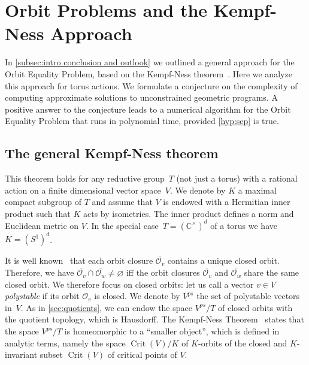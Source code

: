 \documentclass[10pt,a4paper]{article}
\theoremstyle{definition}
\DeclareMathOperator{\Crit}{Crit}
\newcommand{\CC}{\mathbb{C}}
\newcommand{\OO}{\ensuremath{\mathcal{O}}}
\numberwithin{equation}{section}
\begin{document}
\section{Orbit Problems and the Kempf-Ness Approach}\label{sec:kempf-ness}
In \cref{subsec:intro conclusion and outlook} we outlined a general approach for
the Orbit Equality Problem,
based on the Kempf-Ness theorem~\cite{kempfness}.
Here we analyze this approach for torus actions.
We formulate a conjecture on the complexity of computing approximate solutions to unconstrained geometric programs.
A positive answer to the conjecture leads to a numerical algorithm for the Orbit Equality Problem  %
that runs in polynomial time, provided \cref{hyp:sep} is true.


\subsection{The general Kempf-Ness theorem}
This theorem holds for any reductive group~$T$
(not just a torus) with a rational action on a finite dimensional vector space~$V$.
We denote by $K$ a maximal compact subgroup of $T$ and assume that $V$
is endowed with a Hermitian inner product such that $K$ acts by isometries.
The inner product defines a norm and Euclidean metric on $V$.
In the special case~$T=(\CC^\times)^d$ of a torus we have $K=(S^1)^d$.

It is well known~\cite[Thm.~2.3.6]{derksen-kemper}
that each orbit closure $\overline{\OO_v}$ contains a unique closed orbit.
Therefore, we have
$\overline{\OO_v}\cap\overline{\OO_w}\neq\varnothing$
iff the orbit closures $\overline{\OO_v}$ and $\overline{\OO_w}$ share the same closed orbit.
We therefore focus on closed orbits:
let us call a vector $v\in V$ \textit{polystable} if its orbit $\OO_v$ is closed.
We denote by $V^{ps}$ the set of polystable vectors in~$V$.
As in \cref{sec:quotients}, we can endow the space $V^{ps}/T$
of closed orbits with the quotient topology, which is Hausdorff.
The Kempf-Ness Theorem~\cite{kempfness}
states that the space $V^{ps}/T$ is homeomorphic to a ``smaller object'',
which is defined in analytic terms, namely the space $\Crit(V)/K$
of $K$-orbits of the closed and $K$-invariant subset $\Crit(V)$ of critical points of $V$.
\end{document}

